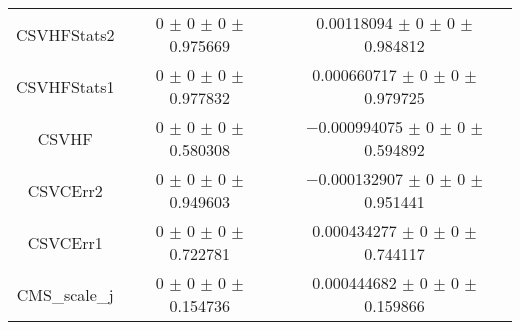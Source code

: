 \begin{table}
\begin{tabular}{ccc}
CSVHFStats2 & \num{0} $\pm$ \num{0} $\pm$ \num{0} $\pm$ \num{0.975669} & \num{0.00118094} $\pm$ \num{0} $\pm$ \num{0} $\pm$ \num{0.984812}\\
CSVHFStats1 & \num{0} $\pm$ \num{0} $\pm$ \num{0} $\pm$ \num{0.977832} & \num{0.000660717} $\pm$ \num{0} $\pm$ \num{0} $\pm$ \num{0.979725}\\
CSVHF & \num{0} $\pm$ \num{0} $\pm$ \num{0} $\pm$ \num{0.580308} & \num{-0.000994075} $\pm$ \num{0} $\pm$ \num{0} $\pm$ \num{0.594892}\\
CSVCErr2 & \num{0} $\pm$ \num{0} $\pm$ \num{0} $\pm$ \num{0.949603} & \num{-0.000132907} $\pm$ \num{0} $\pm$ \num{0} $\pm$ \num{0.951441}\\
CSVCErr1 & \num{0} $\pm$ \num{0} $\pm$ \num{0} $\pm$ \num{0.722781} & \num{0.000434277} $\pm$ \num{0} $\pm$ \num{0} $\pm$ \num{0.744117}\\
CMS\_scale\_j & \num{0} $\pm$ \num{0} $\pm$ \num{0} $\pm$ \num{0.154736} & \num{0.000444682} $\pm$ \num{0} $\pm$ \num{0} $\pm$ \num{0.159866}\\
\bottomrule
\end{tabular}
\end{table}